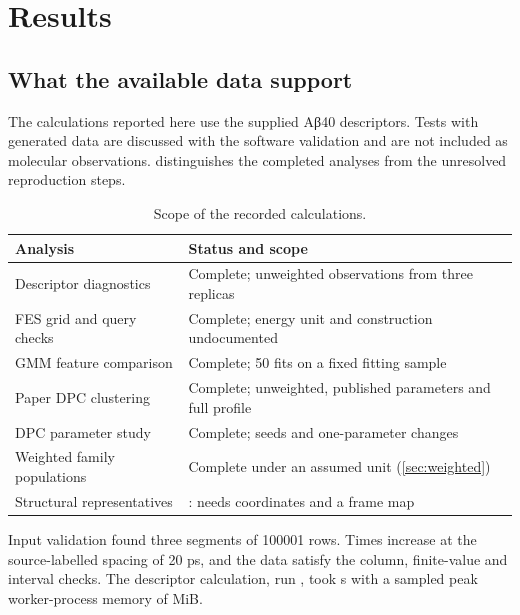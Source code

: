 \chapter{Results}
\label{ch:results}
\section{What the available data support}
The calculations reported here use the supplied Aβ40 descriptors. Tests with generated data are discussed with the software validation and are not included as molecular observations.  distinguishes the completed analyses from the unresolved reproduction steps.

\begin{table}[htbp]
\centering
\caption{Scope of the recorded calculations.}
\label{tab:status}
\begin{tabularx}{\textwidth}{@{}lX@{}}
\toprule
Analysis & Status and scope\\
\midrule
Descriptor diagnostics & Complete; unweighted observations from three replicas\\
FES grid and query checks & Complete; energy unit and construction undocumented\\
GMM feature comparison & Complete; 50 fits on a fixed fitting sample\\
Paper DPC clustering & Complete; unweighted, published parameters and full profile\\
DPC parameter study & Complete; seeds and one-parameter changes\\
Weighted family populations & Complete under an assumed \kJmol{} unit (\cref{sec:weighted})\\
Structural representatives & \blocked{}: needs coordinates and a frame map\\
\bottomrule
\end{tabularx}
\end{table}

Input validation found three segments of \num{100001} rows. Times increase at the source-labelled spacing of 20 ps, and the data satisfy the column, finite-value and interval checks. The descriptor calculation, run \code{\DiagnosticRun}, took \DiagnosticSeconds{} s with a sampled peak worker-process memory of \DiagnosticMemory{} MiB.

